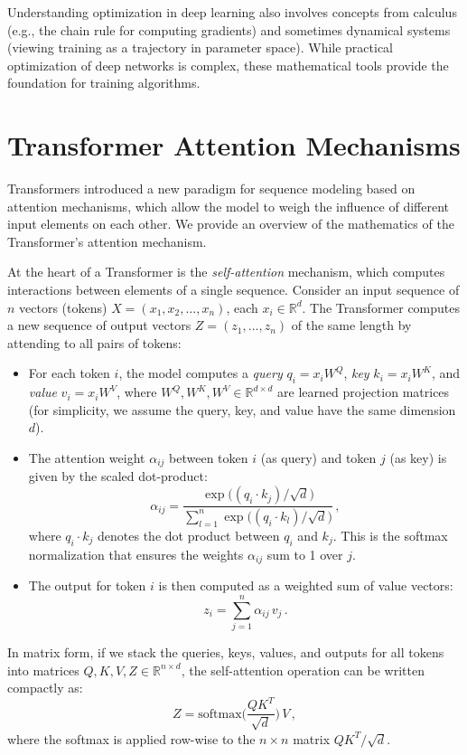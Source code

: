 \documentclass[conference]{IEEEtran}
\begin{document}
Understanding optimization in deep learning also involves concepts from calculus (e.g., the chain rule for computing gradients) and sometimes dynamical systems (viewing training as a trajectory in parameter space). While practical optimization of deep networks is complex, these mathematical tools provide the foundation for training algorithms.

\section{Transformer Attention Mechanisms}
Transformers \cite{vaswani2017} introduced a new paradigm for sequence modeling based on attention mechanisms, which allow the model to weigh the influence of different input elements on each other. We provide an overview of the mathematics of the Transformer's attention mechanism.

At the heart of a Transformer is the \emph{self-attention} mechanism, which computes interactions between elements of a single sequence. Consider an input sequence of $n$ vectors (tokens) $X = (x_1, x_2, \dots, x_n)$, each $x_i \in \mathbb{R}^{d}$. The Transformer computes a new sequence of output vectors $Z = (z_1, \dots, z_n)$ of the same length by attending to all pairs of tokens:
\begin{itemize}
    \item For each token $i$, the model computes a \emph{query} $q_i = x_i W^Q$, \emph{key} $k_i = x_i W^K$, and \emph{value} $v_i = x_i W^V$, where $W^Q, W^K, W^V \in \mathbb{R}^{d \times d}$ are learned projection matrices (for simplicity, we assume the query, key, and value have the same dimension $d$).
    \item The attention weight $\alpha_{ij}$ between token $i$ (as query) and token $j$ (as key) is given by the scaled dot-product:
    \begin{equation}
    \alpha_{ij} = \frac{\exp\!\big((q_i \cdot k_j)/\sqrt{d}\big)}{\sum_{l=1}^{n} \exp\!\big((q_i \cdot k_l)/\sqrt{d}\big)}\,,
    \end{equation}
    where $q_i \cdot k_j$ denotes the dot product between $q_i$ and $k_j$. This is the softmax normalization that ensures the weights $\alpha_{ij}$ sum to 1 over $j$.
    \item The output for token $i$ is then computed as a weighted sum of value vectors:
    \begin{equation}
    z_i = \sum_{j=1}^{n} \alpha_{ij} \, v_j\,.
    \end{equation}
\end{itemize}
In matrix form, if we stack the queries, keys, values, and outputs for all tokens into matrices $Q, K, V, Z \in \mathbb{R}^{n \times d}$, the self-attention operation can be written compactly as:
\begin{equation}
Z = \mathrm{softmax}\!\Big(\frac{Q K^T}{\sqrt{d}}\Big)\, V\,,
\end{equation}
where the softmax is applied row-wise to the $n \times n$ matrix $QK^T/\sqrt{d}$.
\end{document}
